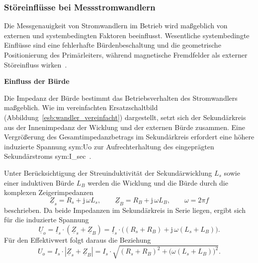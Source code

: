 \subsubsection{Störeinflüsse bei Messstromwandlern}
\label{sec:stoerfelder_schaltanlagen}

Die Messgenauigkeit von Stromwandlern im Betrieb wird maßgeblich von externen und systembedingten Faktoren beeinflusst. Wesentliche systembedingte Einflüsse sind eine fehlerhafte Bürdenbeschaltung und die geometrische Positionierung des Primärleiters, während magnetische Fremdfelder als externer Störeinfluss wirken~\cite[S.~65]{book-Technologie_Messwandler-Minkner}.

\pagebreak[4]
\medskip
\noindent\textbf{Einfluss der Bürde}\par
\label{par:einfluss_buerde}

Die Impedanz der Bürde bestimmt das Betriebsverhalten des Stromwandlers maßgeblich. Wie im vereinfachten Ersatzschaltbild (Abbildung~\ref{esb:wandler_vereinfacht}) dargestellt, setzt sich der Sekundärkreis aus der Innenimpedanz der Wicklung und der externen Bürde zusammen. Eine Vergrößerung des Gesamtimpedanzbetrags im Sekundärkreis erfordert eine höhere induzierte Spannung \gls{sym:Uo} zur Aufrechterhaltung des eingeprägten Sekundärstroms \gls{sym:I_sec}~\cite[S.~65--67]{book-Technologie_Messwandler-Minkner}.

Unter Berücksichtigung der Streuinduktivität der Sekundärwicklung \(L_s\) sowie einer induktiven Bürde \(L_B\) werden die Wicklung und die Bürde durch die komplexen Zeigerimpedanzen
\begin{equation}
    \underline{Z}_s = R_s + \mathrm{j}\,\omega L_s,
    \qquad
    \underline{Z}_B = R_B + \mathrm{j}\,\omega L_B,
    \qquad \omega = 2\pi f
    \label{eq:impedanzen}
\end{equation}
beschrieben. Da beide Impedanzen im Sekundärkreis in Serie liegen, ergibt sich für die induzierte Spannung
\begin{equation}
    \underline{U}_o = \underline{I}_s \cdot (\underline{Z}_s + \underline{Z}_B)
    = \underline{I}_s \cdot \bigl((R_s+R_B) + \mathrm{j}\,\omega(L_s+L_B)\bigr).
    \label{eq:spannung_impedanz_zeiger}
\end{equation}
Für den Effektivwert folgt daraus die Beziehung
\begin{equation}
    U_o = I_s \cdot \left|\underline{Z}_s + \underline{Z}_B\right|
    = I_s \cdot \sqrt{(R_s+R_B)^2 + \bigl(\omega(L_s+L_B)\bigr)^2}.
    \label{eq:spannung_impedanz}
\end{equation}

